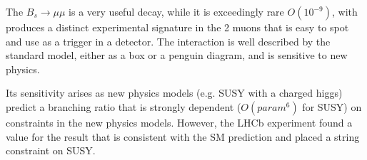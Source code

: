 \documentclass[]{article}
\begin{document}
	The $B_s\rightarrow\mu\mu$ is a very useful decay, while it is exceedingly rare $O(10^{-9})$, with produces a distinct experimental signature in the 2 muons that is easy to spot and use as a trigger in a detector. The interaction is well described by the standard model, either as a box or a penguin diagram, and is sensitive to new physics.
	
	Its sensitivity arises as new physics models (e.g. SUSY with a charged higgs) predict a branching ratio that is strongly dependent ($O(param^6)$ for SUSY) on constraints in the new physics models. However, the LHCb experiment found a value for the result that is consistent with the SM prediction and placed a string constraint on SUSY. 
	
	 
	
	
	
	
\end{document}
